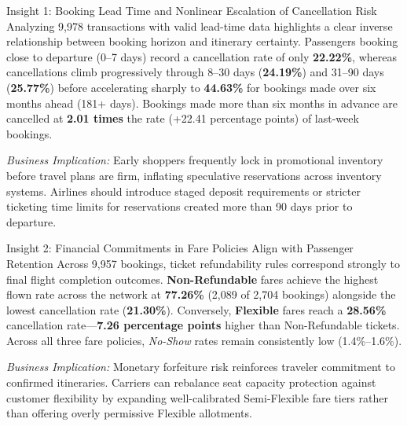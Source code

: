 \documentclass[12pt, a4paper]{report}
\newcommand{\pct}[1]{\textbf{#1\%}}
\begin{document}
\begin{insightbox}{Insight 1: Booking Lead Time and Nonlinear Escalation of Cancellation Risk}
Analyzing 9,978 transactions with valid lead-time data highlights a clear inverse relationship between booking horizon and itinerary certainty. Passengers booking close to departure (0--7 days) record a cancellation rate of only \pct{22.22}, whereas cancellations climb progressively through 8--30 days (\pct{24.19}) and 31--90 days (\pct{25.77}) before accelerating sharply to \pct{44.63} for bookings made over six months ahead (181+ days). Bookings made more than six months in advance are cancelled at \textbf{2.01 times} the rate (+22.41 percentage points) of last-week bookings.

\textit{Business Implication:} Early shoppers frequently lock in promotional inventory before travel plans are firm, inflating speculative reservations across inventory systems. Airlines should introduce staged deposit requirements or stricter ticketing time limits for reservations created more than 90 days prior to departure.
\end{insightbox}

\begin{insightbox}{Insight 2: Financial Commitments in Fare Policies Align with Passenger Retention}
Across 9,957 bookings, ticket refundability rules correspond strongly to final flight completion outcomes. \textbf{Non-Refundable} fares achieve the highest flown rate across the network at \pct{77.26} (2,089 of 2,704 bookings) alongside the lowest cancellation rate (\pct{21.30}). Conversely, \textbf{Flexible} fares reach a \pct{28.56} cancellation rate---\textbf{7.26 percentage points} higher than Non-Refundable tickets. Across all three fare policies, \textit{No-Show} rates remain consistently low (1.4\%--1.6\%).

\textit{Business Implication:} Monetary forfeiture risk reinforces traveler commitment to confirmed itineraries. Carriers can rebalance seat capacity protection against customer flexibility by expanding well-calibrated Semi-Flexible fare tiers rather than offering overly permissive Flexible allotments.
\end{insightbox}
\end{document}
